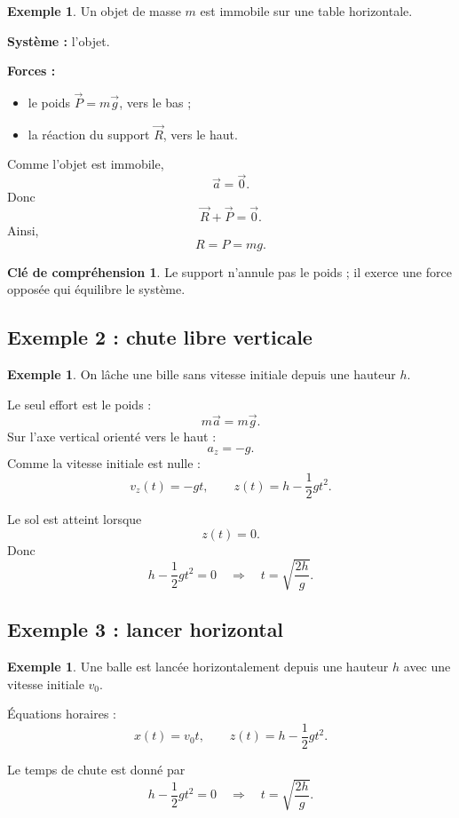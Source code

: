 \documentclass[11pt,a4paper]{article}
\theoremstyle{definition}
\newtheorem{exemple}[definition]{Exemple}
\newtheorem{interpretation}[definition]{Clé de compréhension}
\theoremstyle{plain}
\theoremstyle{remark}
\begin{document}
\begin{exemple}
Un objet de masse $m$ est immobile sur une table horizontale.
\end{exemple}

\textbf{Système :} l'objet.  

\textbf{Forces :}
\begin{itemize}
    \item le poids $\vec{P}=m\vec{g}$, vers le bas ;
    \item la réaction du support $\vec{R}$, vers le haut.
\end{itemize}

Comme l'objet est immobile,
\[
\vec{a}=\vec{0}.
\]
Donc
\[
\vec{R}+\vec{P}=\vec{0}.
\]
Ainsi,
\[
R=P=mg.
\]

\begin{interpretation}
Le support n'annule pas le poids ; il exerce une force opposée qui équilibre le système.
\end{interpretation}

\subsection{Exemple 2 : chute libre verticale}

\begin{exemple}
On lâche une bille sans vitesse initiale depuis une hauteur $h$.
\end{exemple}

Le seul effort est le poids :
\[
m\vec{a}=m\vec{g}.
\]
Sur l'axe vertical orienté vers le haut :
\[
a_z=-g.
\]
Comme la vitesse initiale est nulle :
\[
v_z(t)=-gt,
\qquad
z(t)=h-\frac12 gt^2.
\]

Le sol est atteint lorsque
\[
z(t)=0.
\]
Donc
\[
h-\frac12 gt^2=0
\quad \Longrightarrow \quad
t=\sqrt{\frac{2h}{g}}.
\]

\subsection{Exemple 3 : lancer horizontal}

\begin{exemple}
Une balle est lancée horizontalement depuis une hauteur $h$ avec une vitesse initiale $v_0$.
\end{exemple}

Équations horaires :
\[
x(t)=v_0t,
\qquad
z(t)=h-\frac12 gt^2.
\]

Le temps de chute est donné par
\[
h-\frac12 gt^2=0
\quad \Longrightarrow \quad
t=\sqrt{\frac{2h}{g}}.
\]
\end{document}

